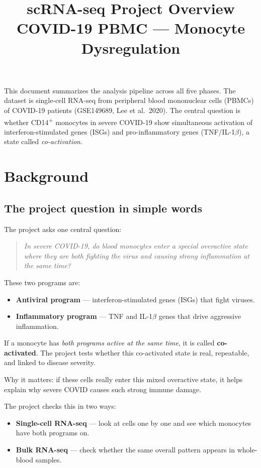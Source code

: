 \documentclass[11pt, a4paper]{article}
\title{\textbf{scRNA-seq Project Overview}\\
\large COVID-19 PBMC — Monocyte Dysregulation}
\author{}
\date{}
\begin{document}
\maketitle

\noindent
This document summarizes the analysis pipeline across all five phases.
The dataset is single-cell RNA-seq from peripheral blood mononuclear cells (PBMCs)
of COVID-19 patients (GSE149689, Lee et al.\ 2020).
The central question is whether CD14\textsuperscript{+} monocytes in severe COVID-19
show simultaneous activation of interferon-stimulated genes (ISGs) and
pro-inflammatory genes (TNF/IL-1\(\beta\)), a state called \textit{co-activation}.

\section{Background}

\subsection{The project question in simple words}

The project asks one central question:

\begin{quote}
\textit{In severe COVID-19, do blood monocytes enter a special overactive state
where they are both fighting the virus and causing strong inflammation at the same time?}
\end{quote}

These two programs are:
\begin{itemize}[nosep]
  \item \textbf{Antiviral program} — interferon-stimulated genes (ISGs) that fight viruses.
  \item \textbf{Inflammatory program} — TNF and IL-1\(\beta\) genes that drive aggressive inflammation.
\end{itemize}

If a monocyte has \textit{both programs active at the same time}, it is called \textbf{co-activated}.
The project tests whether this co-activated state is real, repeatable, and linked to disease severity.

Why it matters: if these cells really enter this mixed overactive state, it helps explain
why severe COVID causes such strong immune damage.

The project checks this in two ways:
\begin{itemize}[nosep]
  \item \textbf{Single-cell RNA-seq} — look at cells one by one and see which monocytes have both programs on.
  \item \textbf{Bulk RNA-seq} — check whether the same overall pattern appears in whole-blood samples.
\end{itemize}
\end{document}
